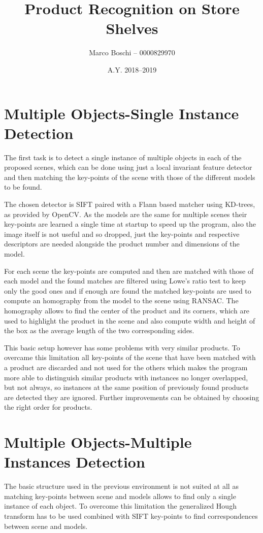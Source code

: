 

\title{Product Recognition on Store Shelves}
\date{A.Y. 2018--2019}
\author{Marco Boschi -- 0000829970}




\section{Multiple Objects-Single Instance Detection}
The first task is to detect a single instance of multiple objects in each of the proposed scenes, which can be done using just a local invariant feature detector and then matching the key-points of the scene with those of the different models to be found.

The chosen detector is SIFT paired with a Flann based matcher using KD-trees, as provided by OpenCV.
As the models are the same for multiple scenes their key-points are learned a single time at startup to speed up the program, also the image itself is not useful and so dropped, just the key-points and respective descriptors are needed alongside the product number and dimensions of the model.

For each scene the key-points are computed and then are matched with those of each model and the found matches are filtered using Lowe's ratio test to keep only the good ones and if enough are found the matched key-points are used to compute an homography from the model to the scene using RANSAC.
The homography allows to find the center of the product and its corners, which are used to highlight the product in the scene and also compute width and height of the box as the average length of the two corresponding sides.

This basic setup however has some problems with very similar products.
To overcame this limitation all key-points of the scene that have been matched with a product are discarded and not used for the others which makes the program more able to distinguish similar products with instances no longer overlapped, but not always, so instances at the same position of previously found products are detected they are ignored.
Further improvements can be obtained by choosing the right order for products.

\section{Multiple Objects-Multiple Instances Detection}
The basic structure used in the previous environment is not suited at all as matching key-points between scene and models allows to find only a single instance of each object.
To overcome this limitation the generalized Hough transform has to be used combined with SIFT key-points to find correspondences between scene and models.

